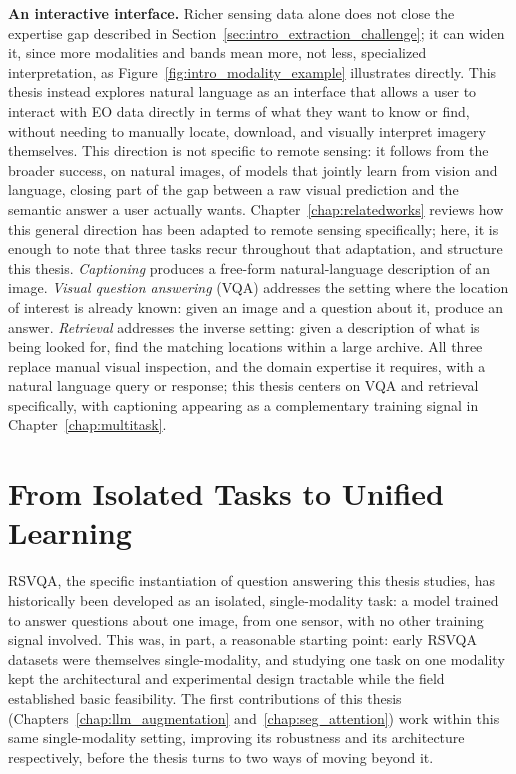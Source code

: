 \textbf{An interactive interface.} Richer sensing data alone does not close the expertise gap described in Section~\ref{sec:intro_extraction_challenge}; it can widen it, since more modalities and bands mean more, not less, specialized interpretation, as Figure~\ref{fig:intro_modality_example} illustrates directly. This thesis instead explores natural language as an interface that allows a user to interact with EO data directly in terms of what they want to know or find, without needing to manually locate, download, and visually interpret imagery themselves. This direction is not specific to remote sensing: it follows from the broader success, on natural images, of models that jointly learn from vision and language, closing part of the gap between a raw visual prediction and the semantic answer a user actually wants. Chapter~\ref{chap:relatedworks} reviews how this general direction has been adapted to remote sensing specifically; here, it is enough to note that three tasks recur throughout that adaptation, and structure this thesis. \textit{Captioning} produces a free-form natural-language description of an image. \textit{Visual question answering} (VQA) addresses the setting where the location of interest is already known: given an image and a question about it, produce an answer. \textit{Retrieval} addresses the inverse setting: given a description of what is being looked for, find the matching locations within a large archive. All three replace manual visual inspection, and the domain expertise it requires, with a natural language query or response; this thesis centers on VQA and retrieval specifically, with captioning appearing as a complementary training signal in Chapter~\ref{chap:multitask}.
 
\section{From Isolated Tasks to Unified Learning}
\label{sec:intro_isolated_unified}
 
RSVQA, the specific instantiation of question answering this thesis studies, has historically been developed as an isolated, single-modality task: a model trained to answer questions about one image, from one sensor, with no other training signal involved. This was, in part, a reasonable starting point: early RSVQA datasets were themselves single-modality, and studying one task on one modality kept the architectural and experimental design tractable while the field established basic feasibility. The first contributions of this thesis (Chapters~\ref{chap:llm_augmentation} and~\ref{chap:seg_attention}) work within this same single-modality setting, improving its robustness and its architecture respectively, before the thesis turns to two ways of moving beyond it.
 
